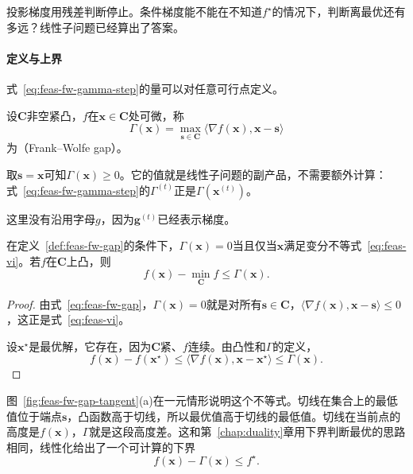 投影梯度用残差判断停止。条件梯度能不能在不知道$f^\star$的情况下，判断离最优还有多远？线性子问题已经算出了答案。

\paragraph{定义与上界}
式~\eqref{eq:feas-fw-gamma-step}的量可以对任意可行点定义。

\begin{definition}
\label{def:feas-fw-gap}
设$\bm{C}$非空紧凸，$f$在$\bm{x}\in\bm{C}$处可微，称
\begin{equation}
 \Gamma(\bm{x})=\max_{\bm{s}\in\bm{C}}\langle\nabla f(\bm{x}),\bm{x}-\bm{s}\rangle
 \label{eq:feas-fw-gap}
\end{equation}
为（Frank--Wolfe gap）。
\end{definition}

取$\bm{s}=\bm{x}$可知$\Gamma(\bm{x})\geq0$。它的值就是线性子问题的副产品，不需要额外计算：式~\eqref{eq:feas-fw-gamma-step}的$\Gamma^{(t)}$正是$\Gamma(\bm{x}^{(t)})$。

这里没有沿用字母$g$，因为$\bm{g}^{(t)}$已经表示梯度。

\begin{theorem}[间隙上界目标差]
\label{thm:feas-fw-gap}
在定义~\ref{def:feas-fw-gap}的条件下，$\Gamma(\bm{x})=0$当且仅当$\bm{x}$满足变分不等式~\eqref{eq:feas-vi}。若$f$在$\bm{C}$上凸，则
\begin{equation}
 f(\bm{x})-\min_{\bm{C}}f\leq\Gamma(\bm{x}).
 \label{eq:feas-fw-gap-bound}
\end{equation}
\end{theorem}

\begin{proof}
由式~\eqref{eq:feas-fw-gap}，$\Gamma(\bm{x})=0$就是对所有$\bm{s}\in\bm{C}$，$\langle\nabla f(\bm{x}),\bm{x}-\bm{s}\rangle\leq0$，这正是式~\eqref{eq:feas-vi}。

设$\bm{x}^\star$是最优解，它存在，因为$\bm{C}$紧、$f$连续。由凸性和$\Gamma$的定义，
\[
 f(\bm{x})-f(\bm{x}^\star)\leq\langle\nabla f(\bm{x}),\bm{x}-\bm{x}^\star\rangle\leq\Gamma(\bm{x}).
\]
\end{proof}

图~\ref{fig:feas-fw-gap-tangent}(a)在一元情形说明这个不等式。切线在集合上的最低值位于端点$\bm{s}$，凸函数高于切线，所以最优值高于切线的最低值。切线在当前点的高度是$f(\bm{x})$，$\Gamma$就是这段高度差。这和第~\ref{chap:duality}章用下界判断最优的思路相同，线性化给出了一个可计算的下界
\[
 f(\bm{x})-\Gamma(\bm{x})\leq f^\star.
\]

